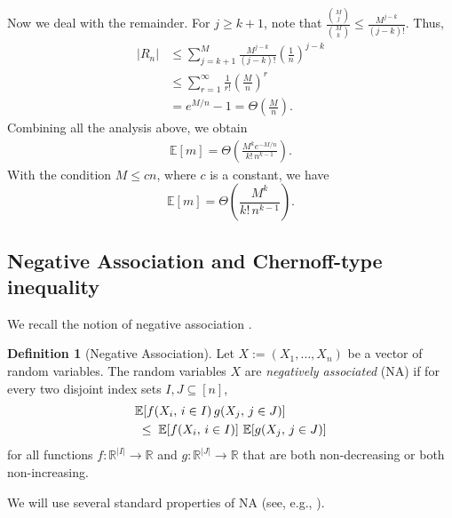 \documentclass[aps,prx,reprint,superscriptaddress,amsmath,amssymb,longbibliography,floatfix]{revtex4-2}
\newcommand{\dsE}{\mathbb{E}}
\theoremstyle{plain}
\theoremstyle{definition}
\newtheorem{definition}[theorem]{Definition}
\theoremstyle{remark}
\begin{document}
Now we deal with the remainder. For \(j\ge k+1\), note that $\frac{\binom{M}{j}}{\binom{M}{k}}\leq \frac{M^{j-k}}{(j-k)!}$. 
Thus,
\begin{align*}
|R_n|&\leq
  \sum_{j=k+1}^{M}
    \frac{M^{j-k}}{(j-k)!}
    \left(\frac1n\right)^{j-k}\\
  &\leq \sum_{r=1}^{\infty}
    \frac{1}{r!} \left( \frac{M}{n} \right)^r\\
  &= e^{M/n}-1 = \Theta \left( \frac{M}{n} \right).
\end{align*}
Combining all the analysis above, we obtain
\begin{align}\label{eqn_ES_bound_order}
\dsE [m]
  = \Theta \left(\frac{M^k e^{-M/n}}{k!\,n^{k-1}} \right) . 
\end{align}
With the condition $M\le cn$, where $c$ is a constant, we have
\begin{equation}
    \dsE [m]
  = \Theta \left(\frac{M^k}{k!\,n^{k-1}} \right).\label{eq: Em M<=cN2}
\end{equation}







\subsection{Negative Association and Chernoff-type inequality}
We recall the notion of negative association \cite{Dubhashi_Ranjan_Negative_Dependence96}.

\begin{definition}[Negative Association]
Let $X := (X_1,\dots,X_n)$ be a vector of random variables. The random variables $X$ are \emph{negatively associated} (NA) if for every two disjoint index sets 
$I, J \subseteq [n]$,
\begin{align}
&\dsE\!\left[ f(X_i,\, i\in I)\, g(X_j,\, j\in J) \right]
  \notag\\
  &\;\le\;
  \dsE\!\left[f(X_i,\, i\in I)\right]\,
  \dsE\!\left[g(X_j,\, j\in J)\right]
\label{eq:app-negative-association-definition}
\end{align}
for all functions $f : \mathbb{R}^{|I|} \to \mathbb{R}$ and 
$g : \mathbb{R}^{|J|} \to \mathbb{R}$ that are both non-decreasing or both non-increasing.
\end{definition}
We will use several standard properties of NA
(see, e.g., \cite{Dubhashi_Ranjan_Negative_Dependence96}).
\end{document}
